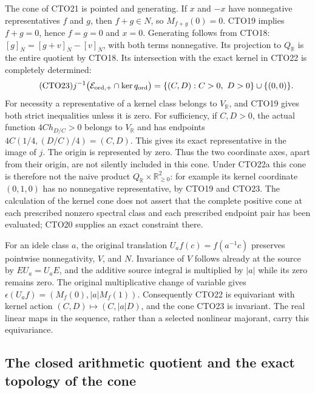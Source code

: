 The cone of CTO21 is pointed and generating. If $x$ and $-x$
have nonnegative representatives $f$ and $g$, then $f+g\in N$,
so $M_{f+g}(0)=0$. CTO19 implies $f+g=0$, hence $f=g=0$
and $x=0$. Generating follows from CTO18:
$[g]_N=[g+v]_N-[v]_N$, with both terms nonnegative.
Its projection to $Q_{\mathbb R}$ is the entire quotient by
CTO18. Its intersection with the exact kernel in CTO22 is
completely determined:
\begin{equation}\tag{CTO23}
j^{-1}\bigl(\mathcal E_{{\rm ord},+}\cap\ker q_{\rm ord}\bigr)
=\{(C,D):C>0,\ D>0\}\cup\{(0,0)\}.
\end{equation}
For necessity a representative of a kernel class belongs to
$V_{\mathbb R}$, and CTO19 gives both strict inequalities unless
it is zero. For sufficiency, if $C,D>0$, the actual function
$4C h_{D/C}>0$ belongs to $V_{\mathbb R}$ and has endpoints
$4C(1/4,(D/C)/4)=(C,D)$. This gives its exact representative
in the image of $j$. The origin is represented by zero.
Thus the two coordinate axes, apart from their origin, are not
silently included in this cone.
Under CTO22a this cone is therefore not the naive product
$Q_{\mathbb R}\times\mathbb R_{\ge0}^2$: for example its
kernel coordinate $(0,1,0)$ has no nonnegative representative,
by CTO19 and CTO23. The calculation of the kernel cone does
not assert that the complete positive cone at each prescribed
nonzero spectral class and each prescribed endpoint pair has
been evaluated; CTO20 supplies an exact constraint there.

For an idele class $a$, the original translation
$U_af(c)=f(a^{-1}c)$ preserves pointwise nonnegativity, $V$,
and $N$. Invariance of $V$ follows already at the source by
$EU_a=U_aE$, and the additive source integral is multiplied
by $|a|$ while its zero remains zero. The original multiplicative
change of variable gives
$\epsilon(U_af)=(M_f(0),|a|M_f(1))$.
Consequently CTO22 is equivariant with kernel action
$(C,D)\mapsto(C,|a|D)$, and the cone CTO23 is invariant.
The real linear maps in the sequence, rather than a selected
nonlinear majorant, carry this equivariance.

\subsection{The closed arithmetic quotient and the exact topology of the cone}

